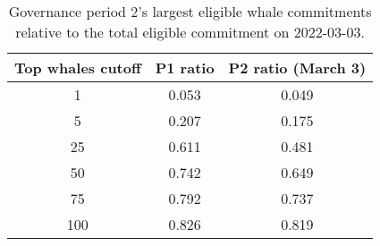 %
\begin{longtable}[c]{ c c c }
\caption{Governance period 2's largest eligible whale commitments relative to the total eligible commitment on 2022-03-03.} \\
\hline
\textbf{Top whales cutoff} & \textbf{P1 ratio} & \textbf{P2 ratio (March 3)} \\
\hline
1 & 0.053 & 0.049 \\ 
5 & 0.207 & 0.175 \\ 
25 & 0.611 & 0.481 \\ 
50 & 0.742 & 0.649 \\ 
75 & 0.792 & 0.737 \\ 
100 & 0.826 & 0.819 \\ 
\hline 
\end{longtable} 
